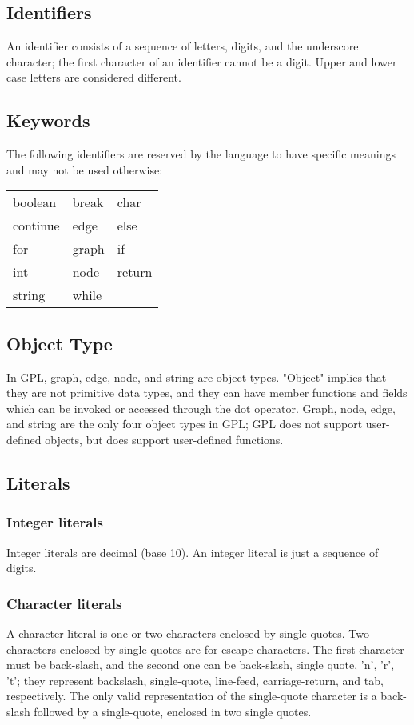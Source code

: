 \documentclass[a4paper,12pt]{article}
\begin{document}
\subsection{Identifiers}
An identifier consists of a sequence of letters, digits, and the underscore character; the first character of an identifier cannot be a digit. Upper and lower case letters are considered different.

\subsection{Keywords}
The following identifiers are reserved by the language to have specific meanings and may not be used otherwise:

\begin{tabular}{ l l l }
\hline
boolean & break & char \\
continue & edge & else \\
for & graph & if \\
int & node & return \\
string & while \\
\hline
\end{tabular}

\subsection{Object Type}
In GPL, graph, edge, node, and string are object types. "Object" implies that they are not primitive data types, and they can have member functions and fields which can be invoked or accessed through the dot operator. Graph, node, edge, and string are the only four object types in GPL; GPL does not support user-defined objects, but does support user-defined functions.

\subsection{Literals}\subsubsection{Integer literals}
Integer literals are decimal (base 10). An integer literal is just a sequence of digits.
\subsubsection{Character literals}
A character literal is one or two characters enclosed by single quotes. Two characters enclosed by single quotes are for escape characters. The first character must be back-slash, and the second one can be back-slash, single quote, 'n', 'r', 't'; they represent backslash, single-quote, line-feed, carriage-return, and tab, respectively. The only valid representation of the single-quote character is a back-slash followed by a single-quote, enclosed in two single quotes.
\end{document}
